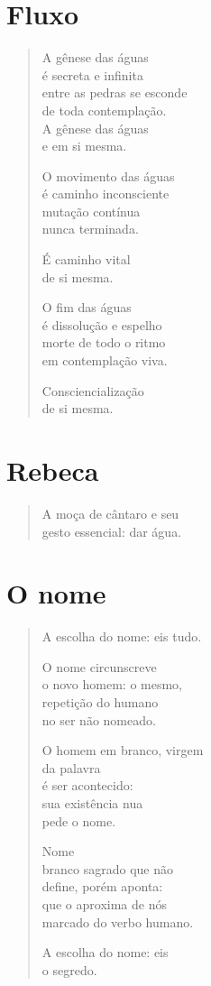 \chapter{Fluxo}

\begin{verse}
A gênese das águas\\
é secreta e infinita\\
entre as pedras se esconde\\
de toda contemplação.\\
A gênese das águas\\
e em si mesma.

\dotfill

O movimento das águas\\
é caminho inconsciente\\
mutação contínua\\
nunca terminada.

É caminho vital\\
de si mesma.

\dotfill

O fim das águas\\
é dissolução e espelho\\
morte de todo o ritmo\\
em contemplação viva.

Consciencialização\\
de si mesma.
\end{verse}

\chapter{Rebeca}

\begin{verse}
A moça de cântaro e seu\\
gesto essencial: dar água.
\end{verse}

\chapter{O nome}

\begin{verse}
A escolha do nome: eis tudo.

O nome circunscreve\\
o novo homem: o mesmo,\\
repetição do humano\\
no ser não nomeado.

O homem em branco, virgem\\
da palavra\\
é ser acontecido:\\
sua existência nua\\
pede o nome.

Nome\\
branco sagrado que não\\
define, porém aponta:\\
que o aproxima de nós\\
marcado do verbo humano.

A escolha do nome: eis\\
o segredo.
\end{verse}

